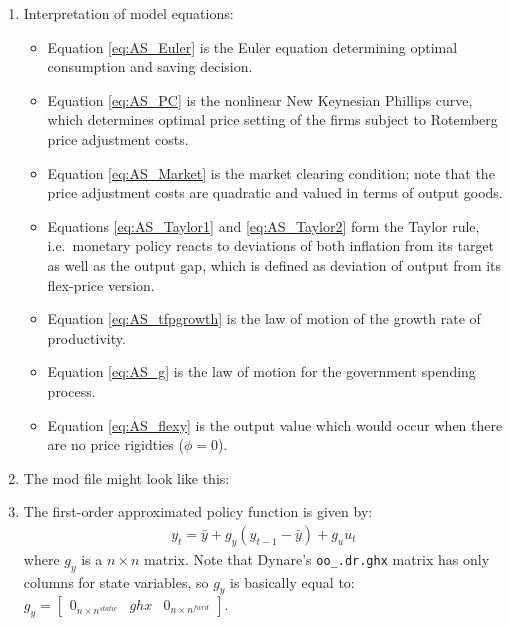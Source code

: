 \begin{enumerate}

\item Interpretation of model equations:
\begin{itemize}
    \item Equation \eqref{eq:AS_Euler} is the Euler equation determining optimal consumption and saving decision.
    \item Equation \eqref{eq:AS_PC} is the nonlinear New Keynesian Phillips curve,
      which determines optimal price setting of the firms subject to Rotemberg price adjustment costs.
    \item Equation \eqref{eq:AS_Market} is the market clearing condition;
      note that the price adjustment costs are quadratic and valued in terms of output goods.
    \item Equations \eqref{eq:AS_Taylor1} and \eqref{eq:AS_Taylor2} form the Taylor rule,
      i.e.\ monetary policy reacts to deviations of both inflation from its target
      as well as the output gap, which is defined as deviation of output from its flex-price version.
    \item Equation \eqref{eq:AS_tfpgrowth} is the law of motion of the growth rate of productivity.
    \item Equation \eqref{eq:AS_g} is the law of motion for the government spending process.
    \item Equation \eqref{eq:AS_flexy} is the output value which would occur when there are no price rigidties ($\phi=0$).
\end{itemize}

\item The mod file might look like this:


\item The first-order approximated policy function is given by:
\begin{align*}
    y_t = \bar{y} + g_y (y_{t-1} - \bar{y}) + g_u u_t
\end{align*}
where $g_y$ is a $n \times n$ matrix.
Note that Dynare's \texttt{oo\_.dr.ghx} matrix has only columns for state variables,
  so $g_y$ is basically equal to: $g_y = \begin{bmatrix} 0_{n \times n^{static}} & ghx & 0_{n \times n^{fwrd}} \end{bmatrix}$.


\end{enumerate}

